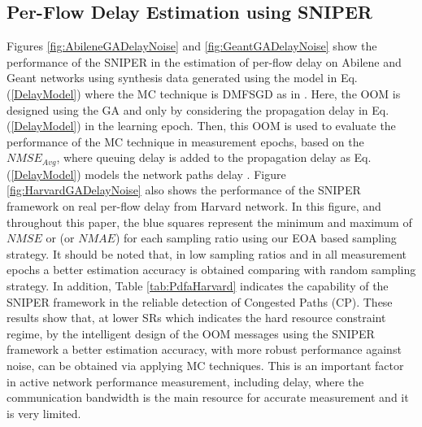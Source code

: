 \subsection{Per-Flow Delay Estimation using SNIPER}
Figures \ref{fig:AbileneGADelayNoise} and \ref{fig:GeantGADelayNoise} show the performance of the SNIPER in the estimation of per-flow delay on Abilene and Geant networks using synthesis data generated using the model in Eq.(\ref{DelayModel}) where the MC technique is DMFSGD as in \cite{YLiao:2011}. Here, the OOM is designed using the GA and only by considering the propagation delay in Eq.(\ref{DelayModel}) in the learning epoch. Then, this OOM is used to evaluate the performance of the MC technique in measurement epochs, based on the $NMSE_{Avg}$, where queuing delay is added to the propagation delay as Eq.(\ref{DelayModel}) models the network paths delay \cite{Pietro:2008}. Figure \ref{fig:HarvardGADelayNoise} also shows the performance of the SNIPER framework on real per-flow delay from Harvard \cite{JLedlie:2007} network. In this figure, and throughout this paper, the blue squares represent the minimum and maximum of $NMSE$ or (or $NMAE$) for each sampling ratio using our EOA based sampling strategy.  It should be noted that, in low sampling ratios and in all measurement epochs a better estimation accuracy is obtained comparing with random sampling strategy. In addition, Table \ref{tab:PdfaHarvard} indicates the capability of the SNIPER framework in the reliable detection of Congested Paths (CP). These results show that, at lower SRs which indicates the hard resource constraint regime, by the intelligent design of the OOM messages using the SNIPER framework a better estimation accuracy, with more robust performance against noise, can be obtained via applying MC techniques. This is an important factor in active network performance measurement, including delay, where the communication bandwidth is the main resource for accurate measurement and it is very limited.

